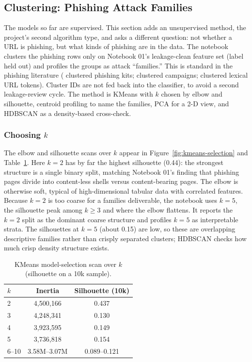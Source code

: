 \documentclass[stu,12pt,floatsintext]{apa7}
\begin{document}
\subsection{Clustering: Phishing Attack Families}

The models so far are supervised. This section adds an unsupervised method,
the project's second algorithm type, and asks a different question: not
whether a URL is phishing, but what kinds of phishing are in the data. The
notebook clusters the phishing rows only on Notebook 01's leakage-clean
feature set (label held out) and profiles the groups as attack
``families.'' This is standard in the phishing literature
(\cite{feng2022} clustered phishing kits; \cite{althobaiti2023} clustered
campaigns; \cite{zia2025} clustered lexical URL tokens). Cluster IDs are
not fed back into the classifier, to avoid a second leakage-review cycle.
The method is KMeans with $k$ chosen by elbow and silhouette, centroid
profiling to name the families, PCA for a 2-D view, and HDBSCAN as a
density-based cross-check.

\subsubsection{Choosing \texorpdfstring{$k$}{k}}

The elbow and silhouette scans over $k$ appear in
Figure~\ref{fig:kmeans-selection} and Table~\ref{tab:kselect}. Here $k=2$
has by far the highest silhouette (0.44): the strongest structure is a
single binary split, matching Notebook 01's finding that phishing pages
divide into content-less shells versus content-bearing pages. The elbow is
otherwise soft, typical of high-dimensional tabular data with correlated
features. Because $k=2$ is too coarse for a families deliverable, the
notebook uses $k=5$, the silhouette peak among $k \geq 3$ and where the
elbow flattens. It reports the $k=2$ split as the dominant coarse
structure and profiles $k=5$ as interpretable strata. The silhouettes at
$k=5$ (about 0.15) are low, so these are overlapping descriptive families
rather than crisply separated clusters; HDBSCAN checks how much crisp
density structure exists.

\begin{table}[htbp]
\centering
\caption{KMeans model-selection scan over $k$ (silhouette on a 10k
sample).}
\label{tab:kselect}
\begin{tabular}{lcc}
\toprule
$k$ & Inertia & Silhouette (10k) \\
\midrule
2      & 4{,}500{,}166 & 0.437 \\
3      & 4{,}248{,}341 & 0.130 \\
4      & 3{,}923{,}595 & 0.149 \\
5      & 3{,}736{,}818 & 0.154 \\
6--10  & 3.58M--3.07M  & 0.089--0.121 \\
\bottomrule
\end{tabular}
\end{table}
\end{document}
